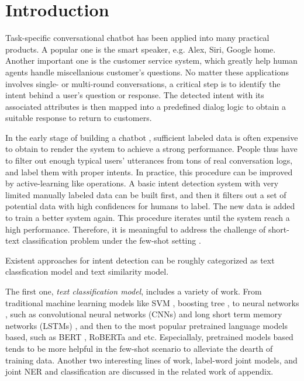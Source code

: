\section{Introduction}
\label{sec:intro}

Task-specific  conversational  chatbot  \cite{wen2016network}  has been applied into  many practical products. 
A popular one is the smart speaker, e.g. Alex, Siri, Google home. 
Another important one is the customer service system, which greatly help human agents handle miscellanious customer's questions.
No matter these applications involves single- or  multi-round conversations, a critical step is to identify  the  intent  behind  a  user's  question or response. 
The detected intent  with  its  associated  attributes is then mapped into a predefined dialog logic to obtain a suitable response to return to customers.

In  the early stage  of  building  a  chatbot , sufficient  labeled  data is often expensive to obtain to render the system to achieve a strong performance.
People thus have to filter out enough typical users' utterances from tons of real conversation logs, and label them  with proper intents. 
In practice, this procedure can be improved by active-learning like operations. 
A basic intent detection system with very limited manually labeled data can be built first, and then it filters out a set of potential data with high confidences for humans to label.
The new data is added to train a better system again. 
This procedure iterates until the system reach a high performance.
Therefore, it is meaningful to address the challenge of short-text classification   \cite{sriram2010short, chen2019deep, phan2008learning,yan2009dynamic,hua2015short}   problem   under the few-shot   setting \cite{yu2018diverse}.

Existent approaches for intent detection can be roughly categorized as text classfication model and text similarity model.

The first one,  \emph{text  classification model},  includes a variety of work.
From  traditional  machine  learning models like SVM \cite{suykens1999least}, boosting tree  \cite{tu2005probabilistic},  to neural networks \cite{wen2016network}, such as   convolutional      neural     networks (CNNs) \cite{kim2014convolutional,zhang2015character,conneau2016very}  and  long  short term  memory  networks  (LSTMs)  \cite{mousa2017contextual,liu2016recurrent}, and then to the most popular pretrained language models based, such as BERT \cite{devlin2018bert}, RoBERTa  \cite{liu2019roberta} and etc. 
Especiallaly, pretrained     models     based    \cite{vaswani2017attention}  tends to be more helpful in the few-shot scenario \cite{yu2018diverse, madabushi2020cost}  to alleviate the dearth of training data.
Another two interesting lines of work, label-word joint models, and joint NER and classification are discussed in the related work of appendix.

